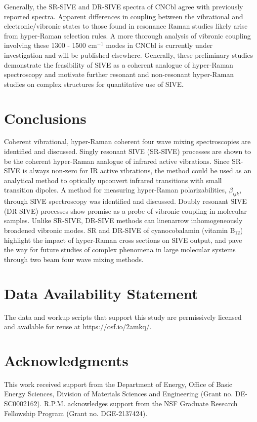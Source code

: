 \documentclass[aip, jcp, draft, onecolumn]{revtex4-2}
\begin{document}
Generally, the SR-SIVE and DR-SIVE spectra of CNCbl agree with previously reported spectra.
Apparent differences in coupling between the vibrational and electronic/vibronic states to those found in resonance Raman studies likely arise from hyper-Raman selection rules. 
A more thorough analysis of vibronic coupling involving these 1300 - 1500 cm$^{-1}$ modes in CNCbl is currently under investigation and will be published elsewhere. \cite{Kaufman2024_1}
Generally, these preliminary studies demonstrate the feasibility of SIVE as a coherent analogue of hyper-Raman spectroscopy and motivate further resonant and non-resonant hyper-Raman studies on complex structures for quantitative use of SIVE.\cite{MyersKelley2008}

\section{Conclusions}
Coherent vibrational, hyper-Raman coherent four wave mixing spectroscopies are identified and discussed.
Singly resonant SIVE (SR-SIVE) processes are shown to be the coherent hyper-Raman analogue of infrared active vibrations.
Since SR-SIVE is always non-zero for IR active vibrations, the method could be used as an analytical method to optically upconvert infrared transitions with small transition dipoles.
A method for measuring hyper-Raman polarizabilities, $\beta_{ijk}$, through SIVE spectroscopy was identified and discussed.
Doubly resonant SIVE (DR-SIVE) processes show promise as a probe of vibronic coupling in molecular samples.
Unlike SR-SIVE, DR-SIVE methods can linenarrow inhomogeneously broadened vibronic modes. 
SR and DR-SIVE of cyanocobalamin (vitamin B$_{12}$) highlight the impact of hyper-Raman cross sections on SIVE output, and pave the way for future studies of complex phenomena in large molecular systems through two beam four wave mixing methods.

\section{Data Availability Statement}
The data and workup scripts that support this study are permissively licensed and available for reuse at https://osf.io/2amkq/. 

\section{Acknowledgments}
This work received support from the Department of Energy, Office of Basic Energy Sciences, Division of Materials Sciences and Engineering (Grant no. DE-SC0002162).
R.P.M. acknowledges support from the NSF Graduate Research Fellowship Program (Grant no. DGE-2137424). 
\end{document}
